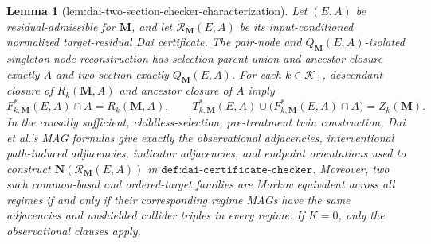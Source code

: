 \documentclass{article}
\newtheorem{lemma}{Lemma}
\begin{document}
\begin{lemma}[lem:dai-two-section-checker-characterization]\label{lem:dai-two-section-checker-characterization}
Let \((E,A)\) be residual-admissible for \(\mathbf M\), and let \(\mathcal R_{\mathbf M}(E,A)\) be its input-conditioned normalized target-residual Dai certificate.  The pair-node and \(Q_{\mathbf M}(E,A)\)-isolated singleton-node reconstruction has selection-parent union and ancestor closure exactly \(A\) and two-section exactly \(Q_{\mathbf M}(E,A)\).  For each \(k\in\mathcal K_+\), descendant closure of \(R_k(\mathbf M,A)\) and ancestor closure of \(A\) imply
\[
F^*_{k,\mathbf M}(E,A)\cap A=R_k(\mathbf M,A),
\qquad
T^*_{k,\mathbf M}(E,A)\cup\bigl(F^*_{k,\mathbf M}(E,A)\cap A\bigr)=Z_k(\mathbf M).
\]
In the causally sufficient, childless-selection, pre-treatment twin construction, Dai et al.'s MAG formulas give exactly the observational adjacencies, interventional path-induced adjacencies, indicator adjacencies, and endpoint orientations used to construct \(\mathbf N(\mathcal R_{\mathbf M}(E,A))\) in \(\texttt{def:dai-certificate-checker}\).  Moreover, two such common-basal and ordered-target families are Markov equivalent across all regimes if and only if their corresponding regime MAGs have the same adjacencies and unshielded collider triples in every regime.  If \(K=0\), only the observational clauses apply.
\end{lemma}
\end{document}
